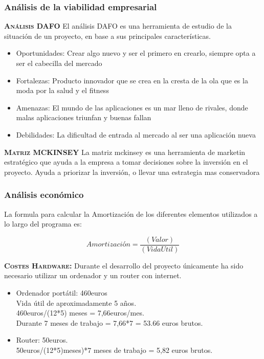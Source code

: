 \subsubsection{Análisis de la viabilidad empresarial}
\textbf{\textsc{Análisis DAFO}}
El análisis DAFO \cite{DAFO} es una herramienta de estudio de la situación de un proyecto, en base a sus principales características.
\begin{itemize}
\item Oportunidades: Crear algo nuevo y ser el primero en crearlo, siempre opta a ser el cabecilla del mercado
\item Fortalezas: Producto innovador que se crea en la cresta de la ola que es la moda por la salud y el fitness
\item Amenazas: El mundo de las aplicaciones es un mar lleno de rivales, donde malas aplicaciones triunfan y buenas fallan
\item Debilidades: La dificultad de entrada al mercado al ser una aplicación nueva	
\end{itemize}
\textbf{\textsc{Matriz MCKINSEY}}
La matriz mckinsey \cite{matriz} es una herramienta de marketin estratégico que ayuda a la empresa a tomar decisiones sobre la inversión en el proyecto. Ayuda a priorizar la inversión, o llevar una estrategia mas conservadora
\subsubsection{Análisis económico}
La formula para calcular la Amortización de los diferentes elementos utilizados a lo largo del programa es:

\begin{equation}
Amortización = \frac{(Valor)}{(VidaUtil)}
\end{equation}

\textbf{\textsc{Costes Hardware:}}
Durante el desarrollo del proyecto únicamente ha sido necesario utilizar un ordenador y un router con internet.
\begin{itemize}
\item Ordenador portátil: 460euros \\Vida útil de aproximadamente 5 años.\\460euros/(12*5) meses = 7,66euros/mes.\\Durante 7 meses de trabajo = 7,66*7 = 53.66 euros brutos.
\item Router: 50euros. \\ 50euros/(12*5)meses)*7 meses de trabajo = 5,82 euros brutos.
\end{itemize}


